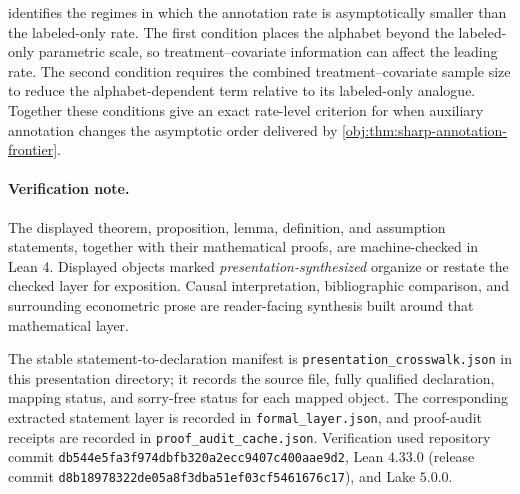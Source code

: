  identifies the regimes in which the annotation rate is asymptotically smaller than the labeled-only rate. The first condition places the alphabet beyond the labeled-only parametric scale, so treatment--covariate information can affect the leading rate. The second condition requires the combined treatment--covariate sample size to reduce the alphabet-dependent term relative to its labeled-only analogue. Together these conditions give an exact rate-level criterion for when auxiliary annotation changes the asymptotic order delivered by \cref{obj:thm:sharp-annotation-frontier}.

\paragraph{Verification note.}
The displayed theorem, proposition, lemma, definition, and assumption statements, together with their mathematical proofs, are machine-checked in Lean 4. Displayed objects marked \emph{presentation-synthesized} organize or restate the checked layer for exposition. Causal interpretation, bibliographic comparison, and surrounding econometric prose are reader-facing synthesis built around that mathematical layer.

The stable statement-to-declaration manifest is
\texttt{presentation\_crosswalk.json} in this presentation directory; it records the source file, fully qualified declaration, mapping status, and sorry-free status for each mapped object. The corresponding extracted statement layer is recorded in \texttt{formal\_layer.json}, and proof-audit receipts are recorded in \texttt{proof\_audit\_cache.json}. Verification used repository commit
\texttt{db544e5fa3f974dbfb320a2ecc9407c400aae9d2}, Lean \(4.33.0\) (release commit \texttt{d8b18978322de05a8f3dba51ef03cf5461676c17}), and Lake \(5.0.0\).
